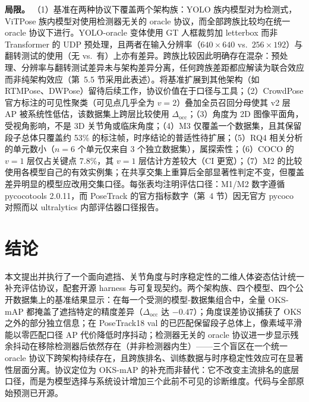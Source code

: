 \documentclass[10pt,conference]{IEEEtran}
\begin{document}
\textbf{局限。} （1）基准在两种协议下覆盖两个架构族：YOLO 族内模型对为检测式，ViTPose 族内模型对使用检测器无关的 oracle 协议，而全部跨族比较均在统一 oracle 协议下进行。YOLO-oracle 变体使用 GT 人框裁剪加 letterbox 而非 Transformer 的 UDP 预处理，且两者在输入分辨率（$640\times640$ vs.\ $256\times192$）与翻转测试的使用（无 vs.\ 有）上亦有差异。跨族比较因此明确存在混杂：预处理、分辨率与翻转测试差异未与架构差异分离，任何跨族差距都应解读为联合效应而非纯架构效应（第~5.5 节采用此表述）。将基准扩展到其他架构（如 RTMPose、DWPose）留待后续工作，协议价值在于口径与工具；（2）CrowdPose 官方标注的可见性聚类（可见点几乎全为 $v{=}2$）叠加全员召回分母使其 v2 层 AP 被系统性低估，该数据集上跨层比较使用 $\Delta_{\mathrm{occ}}$；（3）角度为 2D 图像平面角，受视角影响，不是 3D 关节角或临床角度；（4）M3 仅覆盖一个数据集，且其保留段子总体只覆盖约 53\% 的标注帧，时序结论的普适性待扩展；（5）RQ4 相关分析的单元数小（$n=6$ 个单元仅来自 3 个独立数据集），属探索性；（6）COCO 的 $v{=}1$ 层仅占关键点 7.8\%，其 $v{=}1$ 层估计方差较大（CI 更宽）；（7）M2 的比较使用各模型自己的有效实例集；在共享交集上重算后全部显著性判定不变，但覆盖差异明显的模型应改用交集口径。每张表均注明评估口径：M1/M2 数字遵循 pycocotools 2.0.11，而 PoseTrack 的官方指标数字（第~4 节）因无官方 pycoco 对照而以 ultralytics 内部评估器口径报告。

\section{结论}

本文提出并执行了一个面向遮挡、关节角度与时序稳定性的二维人体姿态估计统一补充评估协议，配套开源 harness 与可复现契约。两个架构族、四个模型、四个公开数据集上的基准结果显示：在每一个受测的模型-数据集组合中，全量 OKS-mAP 都掩盖了遮挡特定的精度差异（$\Delta_{\mathrm{occ}}$ 达 $-0.47$）；角度误差协议捕获了 OKS 之外的部分独立信息；在 PoseTrack18 val 的已匹配保留段子总体上，像素域平滑能以零匹配口径 AP 代价降低时序抖动；检测器无关的 oracle 协议进一步显示残余抖动在移除检测器后依然存在（并非检测器内生）——三个盲区在一个统一 oracle 协议下跨架构持续存在，且跨族排名、训练数据与时序稳定性效应可在显著性层面分离。协议定位为 OKS-mAP 的补充而非替代：它不改变主流排名的底层口径，而是为模型选择与系统设计增加三个此前不可见的诊断维度。代码与全部原始预测已开源。

\end{document}
